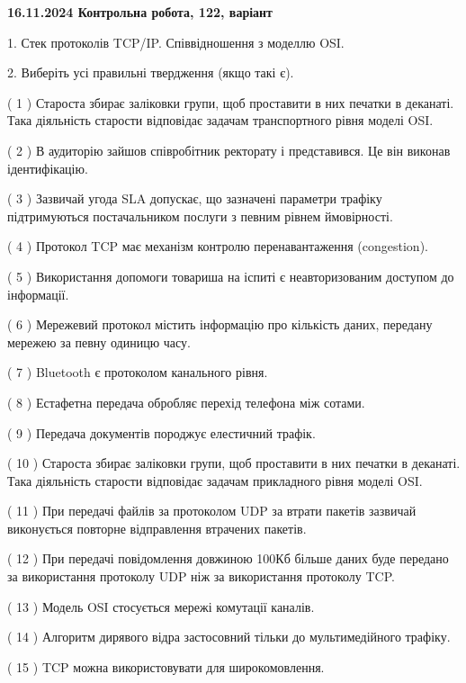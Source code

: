 \documentclass[12pt, ukrainian]{article}
\begin{document}
\vspace{4mm}
\newpage
\begin {large}

\textbf{16.11.2024 Контрольна робота, 122, варіант  }\par


{
1. Стек протоколів TCP/IP. Співвідношення з моделлю OSI.



\vspace{5mm}
2. Виберіть усі правильні твердження (якщо такі є).\par
\vspace{2mm}

( 1 ) Староста збирає заліковки групи, щоб проставити в них печатки в деканаті. Така діяльність старости відповідає задачам транспортного рівня моделі OSI.

( 2 ) В аудиторію зайшов співробітник ректорату і представився. Це він виконав ідентифікацію.

( 3 ) Зазвичай угода  SLA допускає, що зазначені параметри трафіку підтримуються постачальником послуги з певним рівнем ймовірності.

( 4 ) Протокол TCP має механізм контролю перенавантаження (congestion).

( 5 ) Використання допомоги товариша на іспиті є неавторизованим доступом до інформації.

( 6 ) Мережевий протокол містить інформацію про кількість даних, передану мережею за певну одиницю часу.

( 7 ) Bluetooth є протоколом канального рівня.

( 8 ) Естафетна передача обробляє перехід телефона між сотами.

( 9 ) Передача документів породжує елестичний трафік.

( 10 ) Староста збирає заліковки групи, щоб проставити в них печатки в деканаті. Така діяльність старости відповідає задачам прикладного рівня моделі OSI.

( 11 ) При передачі файлів за протоколом UDP за втрати пакетів зазвичай виконується повторне відправлення втрачених пакетів.

( 12 ) При передачі повідомлення довжиною 100Кб більше даних буде передано за використання протоколу UDP ніж за використання протоколу TCP.

( 13 ) Модель OSI стосується мережі комутації каналів.

( 14 ) Алгоритм дирявого відра застосовний тільки до мультимедійного трафіку.

( 15 ) TCP можна використовувати для широкомовлення.
}
\end {large}
\end{document}
